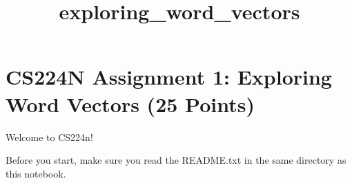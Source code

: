 \documentclass[18pt]{article}
\title{exploring\_word\_vectors}
\begin{document}
    
    
    \maketitle
    
    

    
    \hypertarget{cs224n-assignment-1-exploring-word-vectors-25-points}{%
\section{CS224N Assignment 1: Exploring Word Vectors (25
Points)}\label{cs224n-assignment-1-exploring-word-vectors-25-points}}

Welcome to CS224n!

Before you start, make sure you read the README.txt in the same
directory as this notebook.
\end{document}
